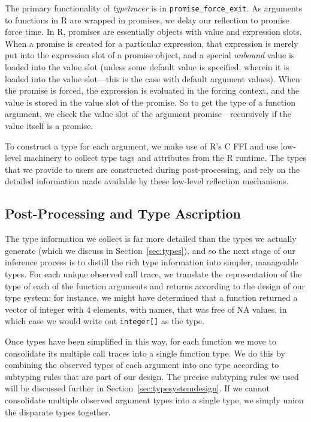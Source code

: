 \documentclass[acmsmall,review,anonymous]{acmart}\settopmatter{printfolios=true,printccs=false,printacmref=false}
\newcommand{\code}[1]{{\lstinline[style=Rin]!#1!}\xspace}
\newcommand{\typetracer}{\emph{typetracer}\xspace} %
\begin{document}
The primary functionality of \typetracer is in {\tt promise\_force\_exit}.
As arguments to functions in R are wrapped in promises, we delay our
reflection to promise force time.  In R, promises are essentially objects
with value and expression slots.  When a promise is created for a particular expression, that
expression is merely put into the expression slot of a promise object, and a
special {\it unbound} value is loaded into the value slot (unless some
default value is specified, wherein it is loaded into the value slot---this
is the case with default argument values).  When the promise is forced, the
expression is evaluated in the forcing context, and the value is stored in
the value slot of the promise.  So to get the type of a function argument,
we check the value slot of the argument promise---recursively if the value
itself is a promise.

To construct a type for each argument, we make use of R's C FFI and use
low-level machinery to collect type tags and attributes from the R runtime.
The types that we provide to users are constructed during post-processing,
and rely on the detailed information made available by these low-level
reflection mechanisms.

%
%
%
%
\subsection{Post-Processing and Type Ascription}

The type information we collect is far more detailed than the types we
actually generate (which we discuss in Section~\ref{sec:types}), and so the
next stage of our inference process is to distill the rich type information
into simpler, manageable types.  For each unique observed call trace, we
translate the representation of the type of each of the function arguments
and returns according to the design of our type system: for instance, we
might have determined that a function returned a vector of integer with 4
elements, with names, that was free of NA values, in which case we would
write out \code{integer[]} as the type.

Once types have been simplified in this way, for each function we move to
consolidate its multiple call traces into a single function type.  We do
this by combining the observed types of each argument into one type
according to subtyping rules that are part of our design.  The precise
subtyping rules we used will be discussed further in
Section~\ref{sec:typesystemdesign}.  If we cannot consolidate multiple
observed argument types into a single type, we simply union the disparate
types together.
\end{document}
